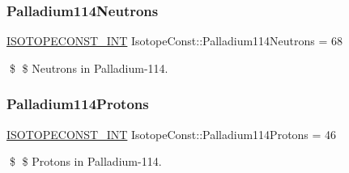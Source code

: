 \subsubsection{\texorpdfstring{Palladium114\+Neutrons}{Palladium114Neutrons}}
{\footnotesize\ttfamily \mbox{\hyperlink{group___isotope_const-_macros_ga5f18360b3e99483a35c32d789e62621c}{I\+S\+O\+T\+O\+P\+E\+C\+O\+N\+S\+T\+\_\+\+I\+NT}} Isotope\+Const\+::\+Palladium114\+Neutrons = 68}

\$ \$ Neutrons in Palladium-\/114. \mbox{\label{group___isotope_const-_palladium-_pd114_ga0086014f2bb0573d81ff668c0afc71af}} 
\subsubsection{\texorpdfstring{Palladium114\+Protons}{Palladium114Protons}}
{\footnotesize\ttfamily \mbox{\hyperlink{group___isotope_const-_macros_ga5f18360b3e99483a35c32d789e62621c}{I\+S\+O\+T\+O\+P\+E\+C\+O\+N\+S\+T\+\_\+\+I\+NT}} Isotope\+Const\+::\+Palladium114\+Protons = 46}

\$ \$ Protons in Palladium-\/114. 